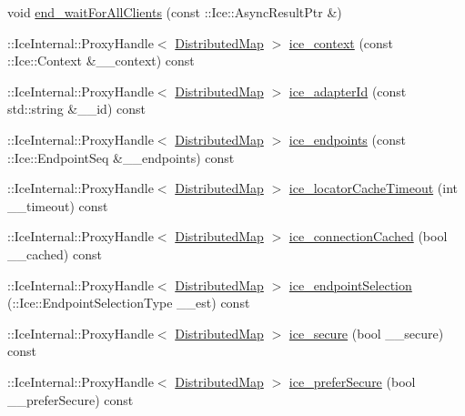 \begin{DoxyCompactItemize}
\item 
void \hyperlink{class_ice_proxy_1_1_global_table_1_1_distributed_map_a2f84e89cda3515a953de82f6fb5ea584}{end\_\-waitForAllClients} (const ::Ice::AsyncResultPtr \&)
\item 
::IceInternal::ProxyHandle$<$ \hyperlink{class_ice_proxy_1_1_global_table_1_1_distributed_map}{DistributedMap} $>$ \hyperlink{class_ice_proxy_1_1_global_table_1_1_distributed_map_a6590a666cda810e05f7bffbfc0319384}{ice\_\-context} (const ::Ice::Context \&\_\-\_\-context) const 
\item 
::IceInternal::ProxyHandle$<$ \hyperlink{class_ice_proxy_1_1_global_table_1_1_distributed_map}{DistributedMap} $>$ \hyperlink{class_ice_proxy_1_1_global_table_1_1_distributed_map_a3aa5aa29f8b8613b475e3ca93ca5d18a}{ice\_\-adapterId} (const std::string \&\_\-\_\-id) const 
\item 
::IceInternal::ProxyHandle$<$ \hyperlink{class_ice_proxy_1_1_global_table_1_1_distributed_map}{DistributedMap} $>$ \hyperlink{class_ice_proxy_1_1_global_table_1_1_distributed_map_a6f435f8be93ddc73bc4d956a03a341bb}{ice\_\-endpoints} (const ::Ice::EndpointSeq \&\_\-\_\-endpoints) const 
\item 
::IceInternal::ProxyHandle$<$ \hyperlink{class_ice_proxy_1_1_global_table_1_1_distributed_map}{DistributedMap} $>$ \hyperlink{class_ice_proxy_1_1_global_table_1_1_distributed_map_a033996fef1b3d4c99cfe0a31ecf7ed14}{ice\_\-locatorCacheTimeout} (int \_\-\_\-timeout) const 
\item 
::IceInternal::ProxyHandle$<$ \hyperlink{class_ice_proxy_1_1_global_table_1_1_distributed_map}{DistributedMap} $>$ \hyperlink{class_ice_proxy_1_1_global_table_1_1_distributed_map_ad4bfc3a8b1293b049906916cacb821db}{ice\_\-connectionCached} (bool \_\-\_\-cached) const 
\item 
::IceInternal::ProxyHandle$<$ \hyperlink{class_ice_proxy_1_1_global_table_1_1_distributed_map}{DistributedMap} $>$ \hyperlink{class_ice_proxy_1_1_global_table_1_1_distributed_map_acae9aa55410a5979b7e3a249106ee77c}{ice\_\-endpointSelection} (::Ice::EndpointSelectionType \_\-\_\-est) const 
\item 
::IceInternal::ProxyHandle$<$ \hyperlink{class_ice_proxy_1_1_global_table_1_1_distributed_map}{DistributedMap} $>$ \hyperlink{class_ice_proxy_1_1_global_table_1_1_distributed_map_a9dd665fafcdd19511c2934b661769e87}{ice\_\-secure} (bool \_\-\_\-secure) const 
\item 
::IceInternal::ProxyHandle$<$ \hyperlink{class_ice_proxy_1_1_global_table_1_1_distributed_map}{DistributedMap} $>$ \hyperlink{class_ice_proxy_1_1_global_table_1_1_distributed_map_a17d4cae6d12bf2e32780b75ad44e3bc1}{ice\_\-preferSecure} (bool \_\-\_\-preferSecure) const 

\end{DoxyCompactItemize}
